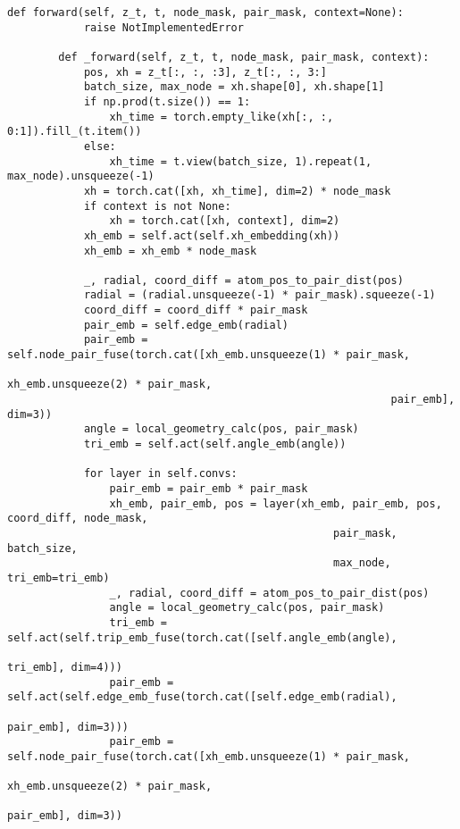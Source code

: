 {\begin{lstlisting}[style=python]
        def forward(self, z_t, t, node_mask, pair_mask, context=None):
            raise NotImplementedError
    
        def _forward(self, z_t, t, node_mask, pair_mask, context):
            pos, xh = z_t[:, :, :3], z_t[:, :, 3:]
            batch_size, max_node = xh.shape[0], xh.shape[1]
            if np.prod(t.size()) == 1:
                xh_time = torch.empty_like(xh[:, :, 0:1]).fill_(t.item())
            else:
                xh_time = t.view(batch_size, 1).repeat(1, max_node).unsqueeze(-1)
            xh = torch.cat([xh, xh_time], dim=2) * node_mask
            if context is not None:
                xh = torch.cat([xh, context], dim=2)
            xh_emb = self.act(self.xh_embedding(xh))
            xh_emb = xh_emb * node_mask
    
            _, radial, coord_diff = atom_pos_to_pair_dist(pos)
            radial = (radial.unsqueeze(-1) * pair_mask).squeeze(-1)
            coord_diff = coord_diff * pair_mask
            pair_emb = self.edge_emb(radial)
            pair_emb = self.node_pair_fuse(torch.cat([xh_emb.unsqueeze(1) * pair_mask,
                                                            xh_emb.unsqueeze(2) * pair_mask, 
                                                            pair_emb], dim=3))
            angle = local_geometry_calc(pos, pair_mask)
            tri_emb = self.act(self.angle_emb(angle))

            for layer in self.convs:
                pair_emb = pair_emb * pair_mask
                xh_emb, pair_emb, pos = layer(xh_emb, pair_emb, pos, coord_diff, node_mask, 
                                                   pair_mask, batch_size,
                                                   max_node, tri_emb=tri_emb)
                _, radial, coord_diff = atom_pos_to_pair_dist(pos)
                angle = local_geometry_calc(pos, pair_mask)
                tri_emb = self.act(self.trip_emb_fuse(torch.cat([self.angle_emb(angle), 
                                                                        tri_emb], dim=4)))     
                pair_emb = self.act(self.edge_emb_fuse(torch.cat([self.edge_emb(radial), 
                                                                         pair_emb], dim=3)))
                pair_emb = self.node_pair_fuse(torch.cat([xh_emb.unsqueeze(1) * pair_mask, 
                                                                xh_emb.unsqueeze(2) * pair_mask, 
                                                                pair_emb], dim=3))
    

\end{lstlisting}}
